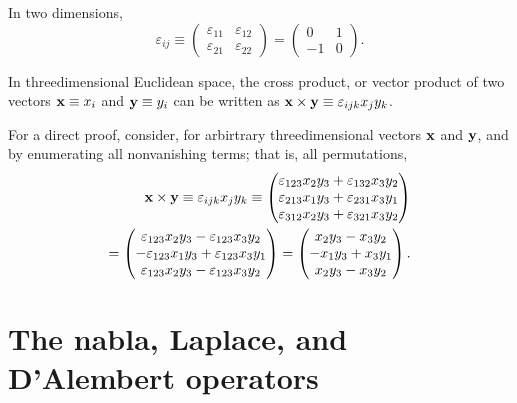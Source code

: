 {
\color{blue}
\bexample

In two dimensions,
$$\varepsilon_{ij}\equiv
\left(
\begin{array}{rrrr}
\varepsilon_{11}&\varepsilon_{12}\\
\varepsilon_{21}&\varepsilon_{22}
\end{array}
\right)
=
\left(
\begin{array}{rrrr}
0&1\\
-1&0
\end{array}
\right)
.
$$
\eexample
}

In threedimensional Euclidean space,
the cross product, or vector product
of two vectors
${\bf x}\equiv x_i$
and
${\bf y}\equiv y_i$
can be written as
${\bf x} \times {\bf y}\equiv \varepsilon_{ijk}x_jy_k$.

{\color{OliveGreen}
\bproof
For a direct proof, consider, for arbirtrary threedimensional vectors ${\bf x}$ and ${\bf y}$,
and by enumerating all nonvanishing terms; that is, all permutations,
\begin{equation}
\begin{split}
{\bf x} \times {\bf y}\equiv \varepsilon_{ijk}x_jy_k
\equiv
\begin{pmatrix}
\varepsilon_{123}x_2y_3 + \varepsilon_{132}x_3y_2 \\
\varepsilon_{213}x_1y_3 + \varepsilon_{231}x_3y_1 \\
\varepsilon_{312}x_2y_3 + \varepsilon_{321}x_3y_2
\end{pmatrix}   \\
=
\begin{pmatrix}
\varepsilon_{123}x_2y_3 - \varepsilon_{123}x_3y_2 \\
-\varepsilon_{123}x_1y_3 + \varepsilon_{123}x_3y_1 \\
\varepsilon_{123}x_2y_3 - \varepsilon_{123}x_3y_2
\end{pmatrix}
=
\begin{pmatrix}
x_2y_3 - x_3y_2 \\
-x_1y_3 + x_3y_1 \\
x_2y_3 - x_3y_2
\end{pmatrix}
.
\end{split}
\end{equation}
\eproof
}

\section{The nabla, Laplace, and D'Alembert operators}

